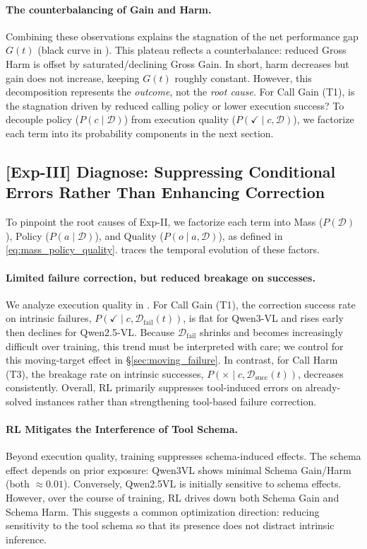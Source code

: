 \paragraph{The counterbalancing of Gain and Harm.}
%
Combining these observations explains the stagnation of the net performance gap $G(t)$ (black curve in ).
%
This plateau reflects a counterbalance: reduced Gross Harm is offset by saturated/declining Gross Gain.
%
In short, harm decreases but gain does not increase, keeping $G(t)$ roughly constant.
%
However, this decomposition represents the \textit{outcome}, not the \textit{root cause}.
%
For Call Gain (T1), is the stagnation driven by reduced calling policy or lower execution success?
%
To decouple policy ($P(c\mid \mathcal D)$) from execution quality ($P(\checkmark\mid c,\mathcal D)$), we factorize each term into its probability components in the next section.

\subsection{[Exp-III] Diagnose: Suppressing Conditional Errors Rather Than Enhancing Correction} \label{sec:exp_diagnose}
%
To pinpoint the root causes of Exp-II, we factorize each term into Mass ($P(\mathcal{D})$), Policy ($P(a\mid\mathcal{D})$), and Quality ($P(o\mid a,\mathcal{D})$), as defined in \cref{eq:mass_policy_quality}.
%
 traces the temporal evolution of these factors.

\paragraph{Limited failure correction, but reduced breakage on successes.}
We analyze execution quality in .
For Call Gain (T1), the correction success rate on intrinsic failures,
$P(\checkmark\mid c,\mathcal D_{\mathrm{fail}}(t))$,
is flat for Qwen3-VL and rises early then declines for Qwen2.5-VL.
Because $\mathcal D_{\mathrm{fail}}$ shrinks and becomes increasingly difficult over training, this trend must be interpreted with care; we control for this moving-target effect in \S\ref{sec:moving_failure}.
In contrast, for Call Harm (T3), the breakage rate on intrinsic successes,
$P(\times\mid c,\mathcal D_{\mathrm{succ}}(t))$,
decreases consistently.
Overall, RL primarily suppresses tool-induced errors on already-solved instances rather than strengthening tool-based failure correction.



\paragraph{RL Mitigates the Interference of Tool Schema.}
%
Beyond execution quality, training suppresses schema-induced effects.
%
The schema effect depends on prior exposure: Qwen3VL shows minimal Schema Gain/Harm (both $\approx0.01$).
%
Conversely, Qwen2.5VL is initially sensitive to schema effects.
%
However, over the course of training, RL drives down both Schema Gain and Schema Harm.
%
This suggests a common optimization direction: reducing sensitivity to the tool schema so that its presence does not distract intrinsic inference.


